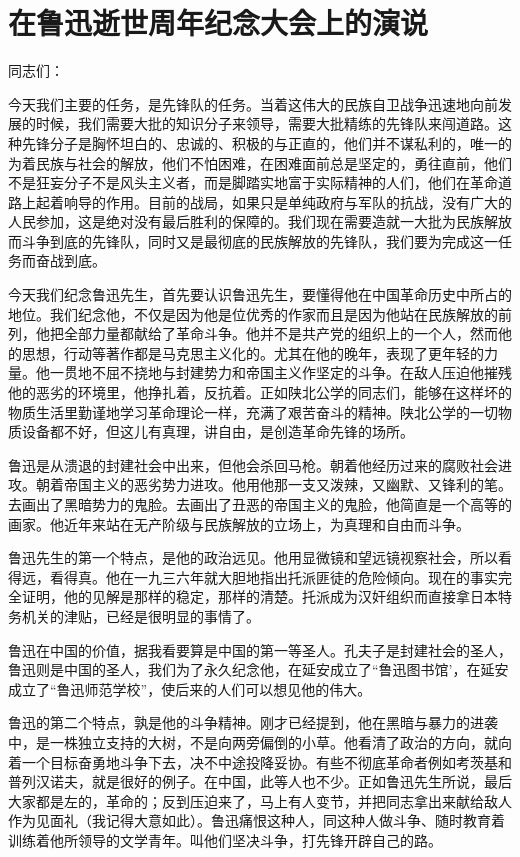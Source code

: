 \section[在鲁迅逝世周年纪念大会上的演说（一九三七年十月十九日）]{在鲁迅逝世周年纪念大会上的演说}


同志们：

今天我们主要的任务，是先锋队的任务。当着这伟大的民族自卫战争迅速地向前发展的时候，我们需要大批的知识分子来领导，需要大批精练的先锋队来闯道路。这种先锋分子是胸怀坦白的、忠诚的、积极的与正直的，他们并不谋私利的，唯一的为着民族与社会的解放，他们不怕困难，在困难面前总是坚定的，勇往直前，他们不是狂妄分子不是风头主义者，而是脚踏实地富于实际精神的人们，他们在革命道路上起着响导的作用。目前的战局，如果只是单纯政府与军队的抗战，没有广大的人民参加，这是绝对没有最后胜利的保障的。我们现在需要造就一大批为民族解放而斗争到底的先锋队，同时又是最彻底的民族解放的先锋队，我们要为完成这一任务而奋战到底。

今天我们纪念鲁迅先生，首先要认识鲁迅先生，要懂得他在中国革命历史中所占的地位。我们纪念他，不仅是因为他是位优秀的作家而且是因为他站在民族解放的前列，他把全部力量都献给了革命斗争。他并不是共产党的组织上的一个人，然而他的思想，行动等著作都是马克思主义化的。尤其在他的晚年，表现了更年轻的力量。他一贯地不屈不挠地与封建势力和帝国主义作坚定的斗争。在敌人压迫他摧残他的恶劣的环境里，他挣扎着，反抗着。正如陕北公学的同志们，能够在这样坏的物质生活里勤谨地学习革命理论一样，充满了艰苦奋斗的精神。陕北公学的一切物质设备都不好，但这儿有真理，讲自由，是创造革命先锋的场所。

鲁迅是从溃退的封建社会中出来，但他会杀回马枪。朝着他经历过来的腐败社会进攻。朝着帝国主义的恶劣势力进攻。他用他那一支又泼辣，又幽默、又锋利的笔。去画出了黑暗势力的鬼脸。去画出了丑恶的帝国主义的鬼脸，他简直是一个高等的画家。他近年来站在无产阶级与民族解放的立场上，为真理和自由而斗争。

鲁迅先生的第一个特点，是他的政治远见。他用显微镜和望远镜视察社会，所以看得远，看得真。他在一九三六年就大胆地指出托派匪徒的危险倾向。现在的事实完全证明，他的见解是那样的稳定，那样的清楚。托派成为汉奸组织而直接拿日本特务机关的津贴，已经是很明显的事情了。

鲁迅在中国的价值，据我看要算是中国的第一等圣人。孔夫子是封建社会的圣人，鲁迅则是中国的圣人，我们为了永久纪念他，在延安成立了“鲁迅图书馆’，在延安成立了“鲁迅师范学校”，使后来的人们可以想见他的伟大。

鲁迅的第二个特点，孰是他的斗争精神。刚才已经提到，他在黑暗与暴力的进袭中，是一株独立支持的大树，不是向两旁偏倒的小草。他看清了政治的方向，就向着一个目标奋勇地斗争下去，决不中途投降妥协。有些不彻底革命者例如考茨基和普列汉诺夫，就是很好的例子。在中国，此等人也不少。正如鲁迅先生所说，最后大家都是左的，革命的；反到压迫来了，马上有人变节，并把同志拿出来献给敌人作为见面礼（我记得大意如此）。鲁迅痛恨这种人，同这种人做斗争、随时教育着训练着他所领导的文学青年。叫他们坚决斗争，打先锋开辟自己的路。

